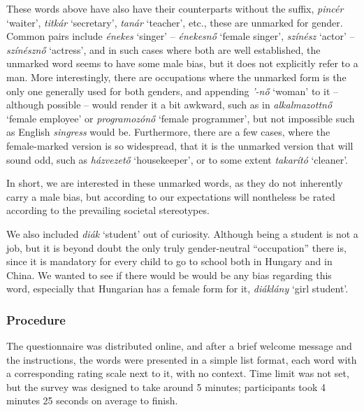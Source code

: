 \documentclass[11pt]{article}
\begin{document}
These words above have also have their counterparts without the suffix, \textit{pincér} `waiter', \textit{titkár} `secretary', \textit{tanár} `teacher', etc., these are unmarked for gender. Common pairs include \textit{énekes} `singer' -- \textit{énekesnő} `female singer', \textit{színész} `actor' -- \textit{színésznő} `actress', and in such cases where both are well established, the unmarked word seems to have some male bias, but it does not explicitly refer to a man. More interestingly, there are occupations where the unmarked form is the only one generally used for both genders, and appending \textit{'-nő} `woman' to it -- although possible -- would render it a bit awkward, such as in \textit{alkalmazottnő} `female employee' or \textit{programozónő} `female programmer', but not impossible such as English \textit{singress} would be. Furthermore, there are a few cases, where the female-marked version is so widespread, that it is the unmarked version that will sound odd, such as \textit{házvezető} `housekeeper', or to some extent \textit{takarító} `cleaner'.

In short, we are interested in these unmarked words, as they do not inherently carry a male bias, but according to our expectations will nontheless be rated according to the prevailing societal stereotypes.

We also included \textit{diák} `student' out of curiosity. Although being a student is not a job, but it is beyond doubt the only truly gender-neutral ``occupation'' there is, since it is mandatory for every child to go to school both in Hungary and in China. We wanted to see if there would be would be any bias regarding this word, especially that Hungarian has a female form for it, \textit{diáklány} `girl student'.


\subsubsection{Procedure}

The questionnaire was distributed online, and after a brief welcome message and the instructions, the words were presented in a simple list format, each word with a corresponding rating scale next to it, with no context. Time limit was not set, but the survey was designed to take around 5 minutes; participants took 4 minutes 25 seconds on average to finish.
\end{document}
